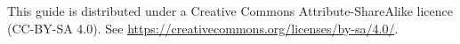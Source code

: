 \newpage
\vspace*{\fill}

This guide is distributed under a Creative Commons Attribute-ShareAlike licence (CC-BY-SA 4.0). See \url{https://creativecommons.org/licenses/by-sa/4.0/}.
\newpage